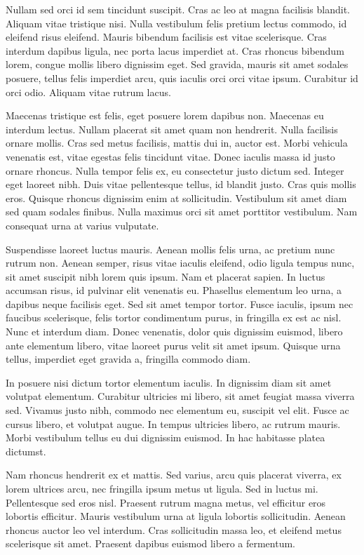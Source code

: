 Nullam sed orci id sem tincidunt suscipit. Cras ac leo at magna facilisis blandit. Aliquam vitae tristique nisi. Nulla vestibulum felis pretium lectus commodo, id eleifend risus eleifend. Mauris bibendum facilisis est vitae scelerisque. Cras interdum dapibus ligula, nec porta lacus imperdiet at. Cras rhoncus bibendum lorem, congue mollis libero dignissim eget. Sed gravida, mauris sit amet sodales posuere, tellus felis imperdiet arcu, quis iaculis orci orci vitae ipsum. Curabitur id orci odio. Aliquam vitae rutrum lacus.

Maecenas tristique est felis, eget posuere lorem dapibus non. Maecenas eu interdum lectus. Nullam placerat sit amet quam non hendrerit. Nulla facilisis ornare mollis. Cras sed metus facilisis, mattis dui in, auctor est. Morbi vehicula venenatis est, vitae egestas felis tincidunt vitae. Donec iaculis massa id justo ornare rhoncus. Nulla tempor felis ex, eu consectetur justo dictum sed. Integer eget laoreet nibh. Duis vitae pellentesque tellus, id blandit justo. Cras quis mollis eros. Quisque rhoncus dignissim enim at sollicitudin. Vestibulum sit amet diam sed quam sodales finibus. Nulla maximus orci sit amet porttitor vestibulum. Nam consequat urna at varius vulputate.

Suspendisse laoreet luctus mauris. Aenean mollis felis urna, ac pretium nunc rutrum non. Aenean semper, risus vitae iaculis eleifend, odio ligula tempus nunc, sit amet suscipit nibh lorem quis ipsum. Nam et placerat sapien. In luctus accumsan risus, id pulvinar elit venenatis eu. Phasellus elementum leo urna, a dapibus neque facilisis eget. Sed sit amet tempor tortor. Fusce iaculis, ipsum nec faucibus scelerisque, felis tortor condimentum purus, in fringilla ex est ac nisl. Nunc et interdum diam. Donec venenatis, dolor quis dignissim euismod, libero ante elementum libero, vitae laoreet purus velit sit amet ipsum. Quisque urna tellus, imperdiet eget gravida a, fringilla commodo diam.

In posuere nisi dictum tortor elementum iaculis. In dignissim diam sit amet volutpat elementum. Curabitur ultricies mi libero, sit amet feugiat massa viverra sed. Vivamus justo nibh, commodo nec elementum eu, suscipit vel elit. Fusce ac cursus libero, et volutpat augue. In tempus ultricies libero, ac rutrum mauris. Morbi vestibulum tellus eu dui dignissim euismod. In hac habitasse platea dictumst.

Nam rhoncus hendrerit ex et mattis. Sed varius, arcu quis placerat viverra, ex lorem ultrices arcu, nec fringilla ipsum metus ut ligula. Sed in luctus mi. Pellentesque sed eros nisl. Praesent rutrum magna metus, vel efficitur eros lobortis efficitur. Mauris vestibulum urna at ligula lobortis sollicitudin. Aenean rhoncus auctor leo vel interdum. Cras sollicitudin massa leo, et eleifend metus scelerisque sit amet. Praesent dapibus euismod libero a fermentum.

